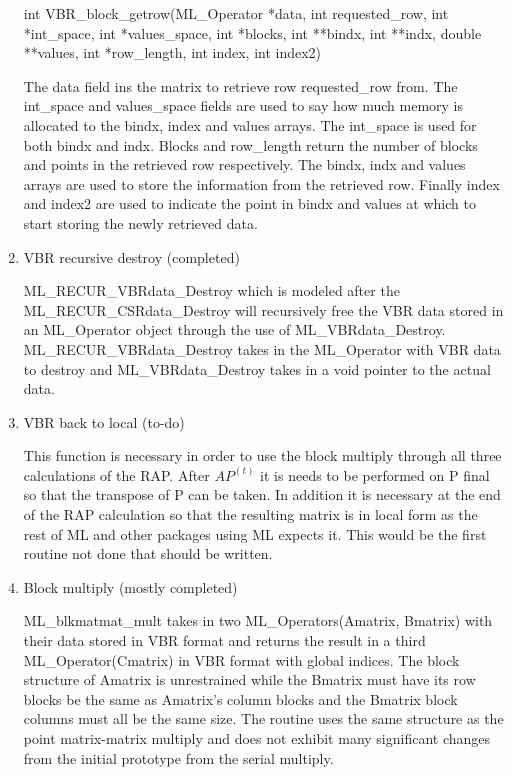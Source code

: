 \documentclass[10pt,letter,relax]{SANDreport}
\begin{document}
\begin{enumerate}
int VBR\_block\_getrow(ML\_Operator *data, int requested\_row,
   int *int\_space, int *values\_space, int *blocks, int **bindx,
   int **indx, double **values, int *row\_length, int index, int index2)

The data field ins the matrix to retrieve row requested\_row from.  The int\_space and values\_space fields are used to say how much memory is allocated to the bindx, index and values arrays.  The int\_space is used for both bindx and indx.  Blocks and row\_length return the number of blocks and points in the retrieved row respectively.  The bindx, indx and values arrays are used to store the information from the retrieved row.  Finally index and index2 are used to indicate the point in bindx and values at which to start storing the newly retrieved data.

  \item  VBR recursive destroy (completed)
  
  ML\_RECUR\_VBRdata\_Destroy which is modeled after the ML\_RECUR\_CSRdata\_Destroy will recursively free the VBR data stored in an ML\_Operator object through the use of ML\_VBRdata\_Destroy.
ML\_RECUR\_VBRdata\_Destroy takes in the ML\_Operator with VBR data to destroy and ML\_VBRdata\_Destroy takes in a void pointer to the actual data.

  \item  VBR back to local (to-do)

  This function is necessary in order to use the block multiply through all
three calculations of the RAP.  After $AP^{(t)}$ it is needs to be performed on P final so that the transpose of P can be taken.
In addition it is necessary at the end of the RAP calculation so that the resulting matrix is in local form as the rest of ML and other packages using ML expects it.
This would be the first routine not done that should be written.

  \item  Block multiply (mostly completed)

  ML\_blkmatmat\_mult takes in two ML\_Operators(Amatrix, Bmatrix) with their data stored in VBR format and returns the result in a third ML\_Operator(Cmatrix) in VBR format with global indices.
The block structure of Amatrix is unrestrained while the Bmatrix must have its row blocks be the same as Amatrix's column blocks and the Bmatrix block columns must all be the same size.
The routine uses the same structure as the point matrix-matrix multiply and does not exhibit many significant changes from the initial prototype from the serial multiply.


\end{enumerate}
\end{document}
